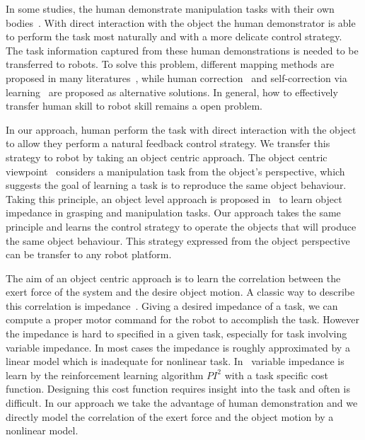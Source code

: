 In some studies, the human demonstrate manipulation tasks with their own bodies~\cite{asfour2008imitation}. With direct interaction with the object the human demonstrator is able to perform the task most naturally and with a more delicate control strategy. The task information captured from these human demonstrations is needed to be transferred to robots. To solve this problem, different mapping methods are proposed in many literatures~\cite{do2011towards,asfour2008imitation,hueser2006learning}, while human correction~\cite{calinon2007incremental,sauser2011iterative,romano2011human} and self-correction via learning~\cite{bidan2013robio} are proposed as alternative solutions. In general, how to effectively transfer human skill to robot skill remains a open problem.

In our approach, human perform the task with direct interaction with the object to allow they perform a natural feedback control strategy. We transfer this strategy to robot by taking an object centric approach. The object centric viewpoint~\cite{okamura2000overview} considers a manipulation task from the object's perspective, which suggests the goal of learning a task is to reproduce the same object behaviour. Taking this principle, an object level approach is proposed in~\cite{Miao2014} to learn object impedance in grasping and manipulation tasks. Our approach takes the same principle and learns the control strategy to operate the objects that will produce the same object behaviour. This strategy expressed from the object perspective can be transfer to any robot platform.

The aim of an object centric approach is to learn the correlation between the exert force of the system and the desire object motion. A classic way to describe this correlation is impedance~\cite{howard2010transferring,wimbock2012comparison}. Giving a desired impedance of a task, we can compute a proper motor command for the robot to accomplish the task. However the impedance is hard to specified in a given task, especially for task involving variable impedance. 
In most cases the impedance is roughly approximated by a linear model which is inadequate for nonlinear task. In~\cite{buchli2011learning} variable impedance is learn by the reinforcement learning algorithm $PI^2$ with a task specific cost function. Designing this cost function requires insight into the task and often is difficult. In our approach we take the advantage of human demonstration and we directly model the correlation of the exert force and the object motion by a nonlinear model.

